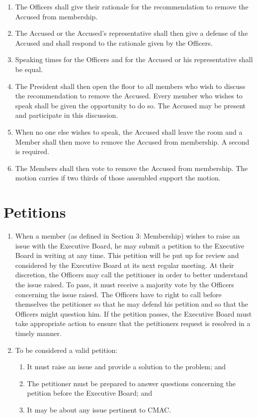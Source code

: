 \documentclass{article}
\begin{document}
\begin{enumerate}
\begin{enumerate}
\begin{enumerate}
\item The Officers shall give their rationale for the recommendation to
remove the Accused from membership.
\item The Accused or the Accused's representative shall then give a defense
of the Accused and shall respond to the rationale given by the Officers.
\item Speaking times for the Officers and for the Accused or his representative
shall be equal.
\item The President shall then open the floor to all members who wish to
discuss the recommendation to remove the Accused. Every member who
wishes to speak shall be given the opportunity to do so. The Accused
may be present and participate in this discussion.
\item When no one else wishes to speak, the Accused shall leave the room
and a Member shall then move to remove the Accused from membership.
A second is required.
\item The Members shall then vote to remove the Accused from membership.
The motion carries if two thirds of those assembled support the motion.
\end{enumerate}
\end{enumerate}
\end{enumerate}

\section{Petitions}
\begin{enumerate}
\item When a member (as defined in Section 3: Membership) wishes to raise
an issue with the Executive Board, he may submit a petition to the
Executive Board in writing at any time. This petition will be put
up for review and considered by the Executive Board at its next regular
meeting. At their discretion, the Officers may call the petitioner
in order to better understand the issue raised. To pass, it must receive
a majority vote by the Officers concerning the issue raised. The Officers
have to right to call before themselves the petitioner so that he
may defend his petition and so that the Officers might question him.
If the petition passes, the Executive Board must take appropriate
action to ensure that the petitioners request is resolved in a timely
manner.
\item To be considered a valid petition:

\begin{enumerate}
\item It must raise an issue and provide a solution to the problem; and
\item The petitioner must be prepared to answer questions concerning the
petition before the Executive Board; and
\item It may be about any issue pertinent to CMAC.
\end{enumerate}
\end{enumerate}
\end{document}
